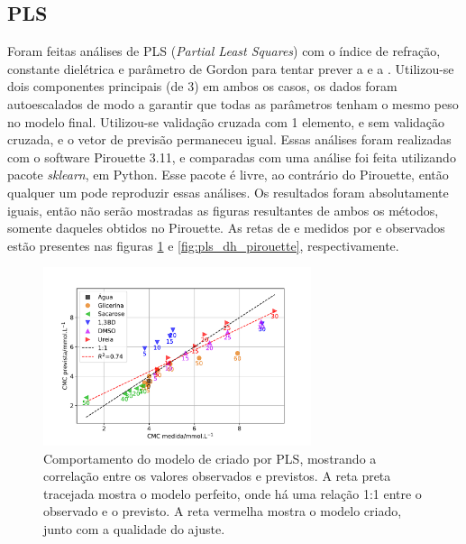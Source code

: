 		\subsection{PLS}
		
		Foram feitas análises de PLS (\emph{Partial Least Squares}) com o índice de refração, constante dielétrica e parâmetro de Gordon para tentar prever a \cmc{} e a \DHmic. Utilizou-se dois componentes principais (de 3) em ambos os casos, os dados foram autoescalados de modo a garantir que todas as parâmetros tenham o mesmo peso no modelo final. Utilizou-se validação cruzada com 1 elemento, e sem validação cruzada, e o vetor de previsão permaneceu igual. Essas análises foram realizadas com o software Pirouette 3.11, e comparadas com uma análise foi feita utilizando pacote \emph{sklearn}, em Python. Esse pacote é livre, ao contrário do Pirouette, então qualquer um pode reproduzir essas análises. Os resultados foram absolutamente iguais, então não serão mostradas as figuras resultantes de ambos os métodos, somente daqueles obtidos no Pirouette. As retas de \cmc{} e \DHmic{} medidos por \cmc{} e \DHmic{} observados estão presentes nas figuras \ref{fig:pls_cmc_pirouette} e \ref{fig:pls_dh_pirouette}, respectivamente.
		
		\begin{figure}[h]
			\centering
			\includegraphics[width=0.7\textwidth]{imagens/itc/PLS_cmc_pirouette}
			\caption{Comportamento do modelo de \cmc{} criado por PLS, mostrando a correlação entre os valores observados e previstos. A reta preta tracejada mostra o modelo perfeito, onde há uma relação 1:1 entre o observado e o previsto. A reta vermelha mostra o modelo criado, junto com a qualidade do ajuste.}
			\label{fig:pls_cmc_pirouette}
		\end{figure}
	
